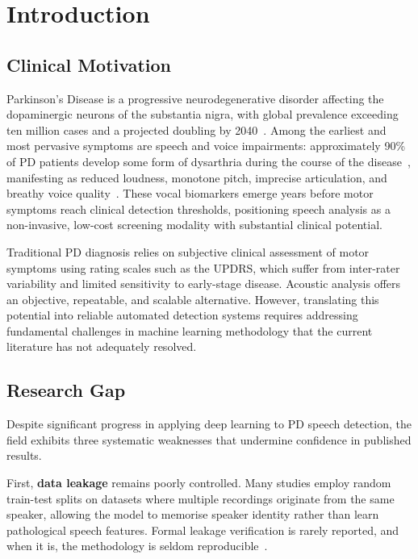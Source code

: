 \documentclass[oneside,openany]{final_report}
\begin{document}
\chapter{Introduction}

\section{Clinical Motivation}

Parkinson's Disease is a progressive neurodegenerative disorder affecting the dopaminergic neurons of the substantia nigra, with global prevalence exceeding ten million cases and a projected doubling by 2040~\cite{dorsey2018}. Among the earliest and most pervasive symptoms are speech and voice impairments: approximately 90\% of PD patients develop some form of dysarthria during the course of the disease~\cite{ho1999}, manifesting as reduced loudness, monotone pitch, imprecise articulation, and breathy voice quality~\cite{duffy2013}. These vocal biomarkers emerge years before motor symptoms reach clinical detection thresholds, positioning speech analysis as a non-invasive, low-cost screening modality with substantial clinical potential.

Traditional PD diagnosis relies on subjective clinical assessment of motor symptoms using rating scales such as the UPDRS, which suffer from inter-rater variability and limited sensitivity to early-stage disease. Acoustic analysis offers an objective, repeatable, and scalable alternative. However, translating this potential into reliable automated detection systems requires addressing fundamental challenges in machine learning methodology that the current literature has not adequately resolved.

\section{Research Gap}

Despite significant progress in applying deep learning to PD speech detection, the field exhibits three systematic weaknesses that undermine confidence in published results.

First, \textbf{data leakage} remains poorly controlled. Many studies employ random train-test splits on datasets where multiple recordings originate from the same speaker, allowing the model to memorise speaker identity rather than learn pathological speech features. Formal leakage verification is rarely reported, and when it is, the methodology is seldom reproducible~\cite{sakar2013, tsanas2012}.
\end{document}
